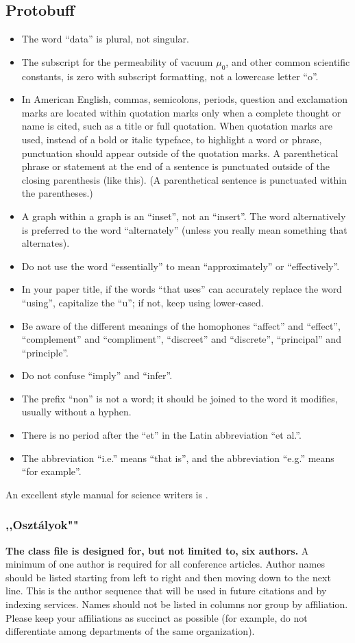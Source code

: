 \documentclass[conference]{IEEEtran}
\begin{document}
\subsection{Protobuff}\label{SCM}
\begin{itemize}
\item The word ``data'' is plural, not singular.
\item The subscript for the permeability of vacuum $\mu_{0}$, and other common scientific constants, is zero with subscript formatting, not a lowercase letter ``o''.
\item In American English, commas, semicolons, periods, question and exclamation marks are located within quotation marks only when a complete thought or name is cited, such as a title or full quotation. When quotation marks are used, instead of a bold or italic typeface, to highlight a word or phrase, punctuation should appear outside of the quotation marks. A parenthetical phrase or statement at the end of a sentence is punctuated outside of the closing parenthesis (like this). (A parenthetical sentence is punctuated within the parentheses.)
\item A graph within a graph is an ``inset'', not an ``insert''. The word alternatively is preferred to the word ``alternately'' (unless you really mean something that alternates).
\item Do not use the word ``essentially'' to mean ``approximately'' or ``effectively''.
\item In your paper title, if the words ``that uses'' can accurately replace the word ``using'', capitalize the ``u''; if not, keep using lower-cased.
\item Be aware of the different meanings of the homophones ``affect'' and ``effect'', ``complement'' and ``compliment'', ``discreet'' and ``discrete'', ``principal'' and ``principle''.
\item Do not confuse ``imply'' and ``infer''.
\item The prefix ``non'' is not a word; it should be joined to the word it modifies, usually without a hyphen.
\item There is no period after the ``et'' in the Latin abbreviation ``et al.''.
\item The abbreviation ``i.e.'' means ``that is'', and the abbreviation ``e.g.'' means ``for example''.
\end{itemize}
An excellent style manual for science writers is \cite{b7}.

\subsubsection{,,Osztályok""}
\textbf{The class file is designed for, but not limited to, six authors.} A 
minimum of one author is required for all conference articles. Author names 
should be listed starting from left to right and then moving down to the 
next line. This is the author sequence that will be used in future citations 
and by indexing services. Names should not be listed in columns nor group by 
affiliation. Please keep your affiliations as succinct as possible (for 
example, do not differentiate among departments of the same organization).
\end{document}
